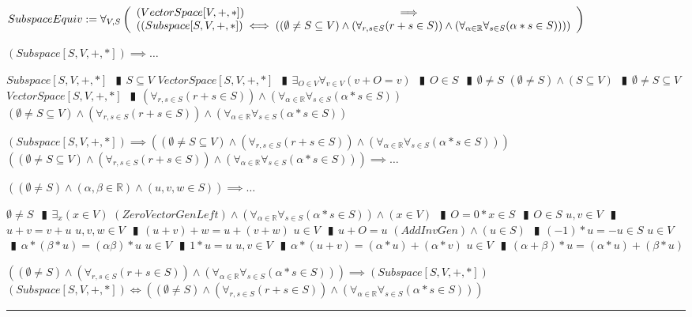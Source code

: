 \documentclass{book}
\newcommand{\abr}{:=}
\newcommand{\pipe}{$\phantom{(}\vrectangleblack\phantom{)}$}
\begin{document}
$SubspaceEquiv \abr \forall_{V, S}\left(\begin{array}{ll}
  (VectorSpace[V, +, *]) \hfill \implies \hfill \\
  ((Subspace[S, V, +, *]) \iff ((\emptyset \neq S \subseteq V) \land (\forall_{r, s \in S}(r + s \in S)) \land (\forall_{\alpha \in \mathbb{R}} \forall_{s \in S}(\alpha * s \in S))))
\end{array}\right)$
\begin{enumerate}
  \lit $(Subspace[S, V, +, *]) \implies \ldots$
  \begin{enumerate}
    \lit $Subspace[S, V, +, *]$ \pipe $S \subseteq V$
    \lit $VectorSpace[S, V, +, *]$ \pipe $\exists_{O \in V} \forall_{v \in V}(v + O = v)$ \pipe $O \in S$ \pipe $\emptyset \neq S$
    \lit $(\emptyset \neq S) \land (S \subseteq V)$ \pipe $\emptyset \neq S \subseteq V$
    \lit $VectorSpace[S, V, +, *]$ \pipe $(\forall_{r, s \in S}(r + s \in S)) \land (\forall_{\alpha \in \mathbb{R}} \forall_{s \in S}(\alpha * s \in S))$
    \lit $(\emptyset \neq S \subseteq V) \land (\forall_{r, s \in S}(r + s \in S)) \land (\forall_{\alpha \in \mathbb{R}} \forall_{s \in S}(\alpha * s \in S))$
  \end{enumerate}
  \lit $(Subspace[S, V, +, *]) \implies ((\emptyset \neq S \subseteq V) \land (\forall_{r, s \in S}(r + s \in S)) \land (\forall_{\alpha \in \mathbb{R}} \forall_{s \in S}(\alpha * s \in S)))$
  \lit $((\emptyset \neq S \subseteq V) \land (\forall_{r, s \in S}(r + s \in S)) \land (\forall_{\alpha \in \mathbb{R}} \forall_{s \in S}(\alpha * s \in S))) \implies \ldots$
  \begin{enumerate}
    \lit $((\emptyset \neq S) \land (\alpha, \beta \in \mathbb{R}) \land (u, v, w \in S)) \implies \ldots$
    \begin{enumerate}
      \lit $\emptyset \neq S$ \pipe $\exists_{x}(x \in V)$
      \lit $(ZeroVectorGenLeft) \land (\forall_{\alpha \in \mathbb{R}} \forall_{s \in S}(\alpha * s \in S)) \land (x \in V)$ \pipe $O = 0 * x \in S$ \pipe $O \in S$
      \lit $u, v \in V$ \pipe $u + v = v + u$
      \lit $u, v, w \in V$ \pipe $(u + v) + w = u + (v + w)$
      \lit $u \in V$ \pipe $u + O = u$
      \lit $(AddInvGen) \land (u \in S)$ \pipe $(-1) * u = -u \in S$
      \lit $u \in V$ \pipe $\alpha * (\beta * u) = (\alpha \beta) * u$
      \lit $u \in V$ \pipe $1 * u = u$
      \lit $u, v \in V$ \pipe $\alpha * (u + v) = (\alpha * u) + (\alpha * v)$
      \lit $u \in V$ \pipe $(\alpha + \beta) * u = (\alpha * u) + (\beta * u)$
    \end{enumerate}
  \end{enumerate}
  \lit $((\emptyset \neq S) \land (\forall_{r, s \in S}(r + s \in S)) \land (\forall_{\alpha \in \mathbb{R}} \forall_{s \in S}(\alpha * s \in S))) \implies (Subspace[S, V, +, *])$
  \lit $(Subspace[S, V, +, *]) \iff ((\emptyset \neq S) \land (\forall_{r, s \in S}(r + s \in S)) \land (\forall_{\alpha \in \mathbb{R}} \forall_{s \in S}(\alpha * s \in S)))$
\end{enumerate} \vspace{.75mm} \hrule \vspace{.75mm} \ \\ 
\end{document}
